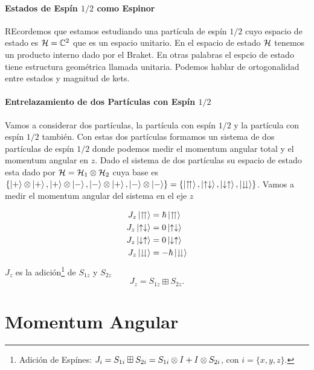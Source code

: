 \subsubsection{Estados de Espín $1/2$ como Espinor}
REcordemos que estamos estudiando una partícula de espín $1/2$ cuyo espacio de estado es $\mathcal{H} = \mathbb{C}^2$ que es un espacio unitario. En el espacio de estado $\mathcal{H}$  tenemos un producto interno dado por el Braket. En otras palabras el espcio de estado tiene estructura geométrica llamada unitaria. Podemos hablar de ortogonalidad entre estados y magnitud de kets. 



\subsubsection{Entrelazamiento de dos Partículas con Espín $1/2$}
Vamos a considerar dos partículas, la partícula con espín $1/2$ y la partícula con espín $1/2$ también. Con estas dos partículas formamos un sistema de dos partículas de espín $1/2$ donde podemos medir el momentum angular total y el momentum angular en $z$. Dado el sistema de dos partículas su espacio de estado esta dado por $\mathcal{H} = \mathcal{H} _1 \otimes \mathcal{H} _2$ cuya base es $\{ \ket{+} \otimes \ket{+}, \ket{+} \otimes \ket{-}, \ket{-} \otimes \ket{+}, \ket{-} \otimes \ket{-} \} = \{ \ket{\upuparrows}, \ket{\uparrow \downarrow}, \ket{\downarrow \uparrow}, \ket{\downdownarrows} \}$. Vamos a medir el momentum angular del sistema en el eje $z$ 

\begin{align*}
	J_z \ket{\upuparrows} &= \hbar \ket{\upuparrows} \\
	J_z \ket{\uparrow \downarrow} &= 0 \ket{\uparrow \downarrow} \\
	J_z \ket{\downarrow \uparrow} &= 0 \ket{\downarrow \uparrow} \\
	J_z \ket{\downdownarrows} &= -\hbar \ket{\downdownarrows}
\end{align*}
$J_z$ es la adición\footnote{Adición de Espínes: $J_{i} = S_{1i} \boxplus S_{2i} = S_{1i} \otimes I + I\otimes S_{2i}$, con $i = \{ x,y,z \}$.} de $S_{1z}$ y $S_{2z}$
\begin{equation}
	J_z = S_{1z} \boxplus S_{2z}.
\end{equation}








\chapter{Momentum Angular}

